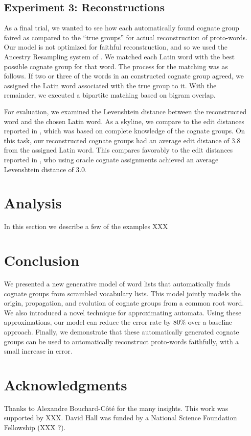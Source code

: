 \documentclass[11pt,a4paper]{article}
\begin{document}
\subsection{Experiment 3: Reconstructions}

As a final trial, we wanted to see how each automatically found
cognate group faired as compared to the ``true groups'' for actual
reconstruction of proto-words. Our model is not optimized for
faithful reconstruction, and so we used the Ancestry Resampling
system of . We matched each Latin word
with the best possible cognate group for that word. The process for
the matching was as follows. If two or three of the words in an
constructed cognate group agreed, we assigned the Latin word
associated with the true group to it. With the remainder, we executed
a bipartite matching based on bigram overlap.

For evaluation, we examined the Levenshtein distance between the
reconstructed word and the chosen Latin word. As a skyline, we
compare to the edit distances reported in ,
which was based on complete knowledge of the cognate groups. On
this task, our reconstructed cognate groups had an average edit
distance of 3.8 from the assigned Latin word. This compares favorably to the
edit distances reported in , who using oracle
cognate assignments achieved an average Levenshtein distance of 3.0.

\section{Analysis}

In this section we describe a few of the examples XXX

\section{Conclusion}

We presented a new generative model of word lists that automatically
finds cognate groups from scrambled vocabulary lists. This model
jointly models the origin, propagation, and evolution of cognate
groups from a common root word. We also introduced a novel technique
for approximating automata. Using these approximations, our model
can reduce the error rate by 80\% over a baseline approach. Finally,
we demonstrate that these automatically generated cognate groups
can be used to automatically reconstruct proto-words faithfully,
with a small increase in error.

\section*{Acknowledgments}

Thanks to Alexandre Bouchard-C\^ot\'e for the many insights. This work was supported by XXX. David Hall was funded by a National
Science Foundation Fellowship (XXX ?).

\nocite{Yarowsky00inducingmultilingual}


\end{document}

